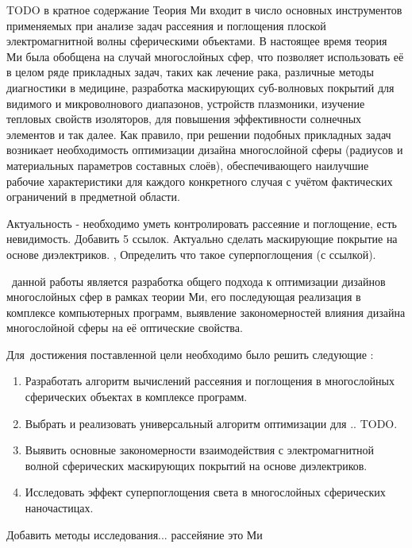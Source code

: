 {\actuality} 

TODO в кратное содержание
Теория Ми входит в число основных инструментов
применяемых при анализе задач рассеяния и поглощения плоской
электромагнитной волны сферическими объектами.  В настоящее время
теория Ми была обобщена на случай многослойных сфер, что позволяет
использовать её в целом ряде прикладных задач, таких как лечение рака,
различные методы диагностики в медицине, разработка маскирующих
суб-волновых покрытий для видимого и микроволнового диапазонов,
устройств плазмоники, изучение тепловых свойств изоляторов, для
повышения эффективности солнечных элементов и так далее.  Как правило,
при решении подобных прикладных задач возникает необходимость
оптимизации дизайна многослойной сферы (радиусов и материальных
параметров составных слоёв), обеспечивающего наилучшие рабочие
характеристики для каждого конкретного случая с учётом фактических
ограничений в предметной области.

Актуальность - необходимо уметь контролировать рассеяние и поглощение,
есть невидимость. Добавить 5 ссылок. Актуально сделать маскирующие
покрытие на основе диэлектриков. , Определить что
такое суперпоглощения (с ссылкой).~\cite{Jingqiao-JADE-2009} 

\aim\ данной работы является разработка общего подхода к оптимизации
дизайнов многослойных сфер в рамках теории Ми, его последующая
реализация в комплексе компьютерных программ, выявление
закономерностей влияния дизайна многослойной сферы на её оптические
свойства.

Для~достижения поставленной цели необходимо было решить следующие {\tasks}:
\begin{enumerate}
  \item Разработать алгоритм вычислений рассеяния и поглощения в
    многослойных сферических объектах  в комплексе программ.
  \item Выбрать и реализовать универсальный алгоритм оптимизации для
    .. TODO.
  \item Выявить основные закономерности взаимодействия с
    электромагнитной волной сферических маскирующих покрытий на
    основе диэлектриков.
  \item Исследовать эффект суперпоглощения света в многослойных
    сферических наночастицах.
\end{enumerate}

Добавить методы исследования... рассейяние это Ми

